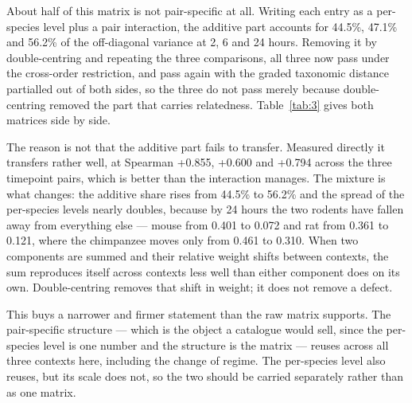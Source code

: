 \documentclass[11pt,a4paper]{article}
\begin{document}
About half of this matrix is not pair-specific at all. Writing each
entry as a per-species level plus a pair interaction, the additive part
accounts for 44.5\%, 47.1\% and 56.2\% of the off-diagonal variance at
2, 6 and 24 hours. Removing it by double-centring and repeating the
three comparisons, all three now pass under the cross-order restriction,
and pass again with the graded taxonomic distance partialled out of both
sides, so the three do not pass merely because double-centring removed
the part that carries relatedness. Table~\ref{tab:3} gives both matrices side by
side.

The reason is not that the additive part fails to transfer. Measured
directly it transfers rather well, at Spearman +0.855, +0.600 and +0.794
across the three timepoint pairs, which is better than the interaction
manages. The mixture is what changes: the additive share rises from
44.5\% to 56.2\% and the spread of the per-species levels nearly
doubles, because by 24 hours the two rodents have fallen away from
everything else --- mouse from 0.401 to 0.072 and rat from 0.361 to
0.121, where the chimpanzee moves only from 0.461 to 0.310. When two
components are summed and their relative weight shifts between contexts,
the sum reproduces itself across contexts less well than either
component does on its own. Double-centring removes that shift in weight;
it does not remove a defect.

This buys a narrower and firmer statement than the raw matrix supports.
The pair-specific structure --- which is the object a catalogue would
sell, since the per-species level is one number and the structure is the
matrix --- reuses across all three contexts here, including the change
of regime. The per-species level also reuses, but its scale does not, so
the two should be carried separately rather than as one matrix.
\end{document}
